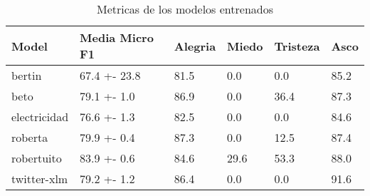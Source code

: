 \begin{table}
\caption{Metricas de los modelos entrenados}
\label{table:model_results}
\centering
\begin{tabular}{llllll}
\toprule
Model & Media Micro F1 & Alegria & Miedo & Tristeza & Asco \\
\midrule
bertin & 67.4 +- 23.8 & 81.5 & 0.0 & 0.0 & 85.2 \\
beto & 79.1 +- 1.0 & 86.9 & 0.0 & 36.4 & 87.3 \\
electricidad & 76.6 +- 1.3 & 82.5 & 0.0 & 0.0 & 84.6 \\
roberta & 79.9 +- 0.4 & 87.3 & 0.0 & 12.5 & 87.4 \\
robertuito & 83.9 +- 0.6 & 84.6 & 29.6 & 53.3 & 88.0 \\
twitter-xlm & 79.2 +- 1.2 & 86.4 & 0.0 & 0.0 & 91.6 \\
\bottomrule
\end{tabular}
\end{table}
